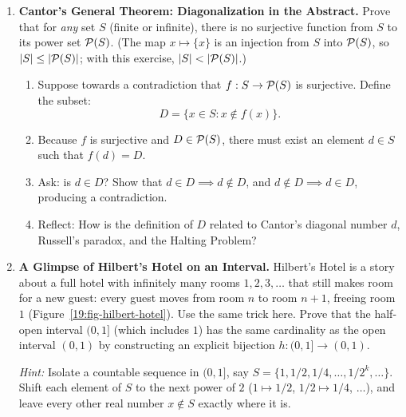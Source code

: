 \begin{enumerate}
\item \textbf{Cantor's General Theorem: Diagonalization in the Abstract.}
Prove that for \emph{any} set $S$ (finite or infinite), there is no surjective function from $S$ to its power set $\mathcal{P}(S)$. (The map $x \mapsto \{x\}$ is an injection from $S$ into $\mathcal{P}(S)$, so $|S| \le |\mathcal{P}(S)|$; with this exercise, $|S| < |\mathcal{P}(S)|$.)
\begin{enumerate}[label=(\alph*)]
\item Suppose towards a contradiction that $f: S \to \mathcal{P}(S)$ is surjective. Define the subset:
\[
D = \{x \in S : x \notin f(x)\}.
\]
\item Because $f$ is surjective and $D \in \mathcal{P}(S)$, there must exist an element $d \in S$ such that $f(d) = D$.
\item Ask: is $d \in D$? Show that $d \in D \implies d \notin D$, and $d \notin D \implies d \in D$, producing a contradiction.
\item Reflect: How is the definition of $D$ related to Cantor's diagonal number $d$, Russell's paradox, and the Halting Problem?
\end{enumerate}

\item \textbf{A Glimpse of Hilbert's Hotel on an Interval.}
Hilbert's Hotel is a story about a full hotel with infinitely many rooms $1, 2, 3, \dots$ that still makes room for a new guest: every guest moves from room $n$ to room $n + 1$, freeing room $1$ (Figure~\ref{19:fig-hilbert-hotel}). Use the same trick here.
Prove that the half-open interval $(0, 1]$ (which includes $1$) has the same cardinality as the open interval $(0, 1)$ by constructing an explicit bijection $h: (0, 1] \to (0, 1)$.
\par\vspace{0.2em}
\emph{Hint:} Isolate a countable sequence in $(0, 1]$, say $S = \{1, 1/2, 1/4, \dots, 1/2^k, \dots\}$. Shift each element of $S$ to the next power of $2$ ($1 \mapsto 1/2$, $1/2 \mapsto 1/4$, $\dots$), and leave every other real number $x \notin S$ exactly where it is.
\end{enumerate}

